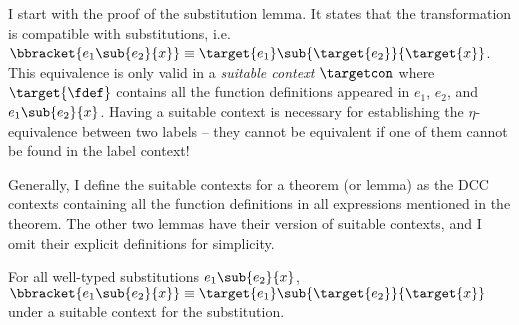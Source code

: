 I start with the proof of the substitution lemma. It states that the transformation is compatible with substitutions, i.e.~$\bbracket{e_1 \sub{e_2}{x}} \equiv \target{e_1} \sub{\target{e_2}}{\target{x}}$. This equivalence is only valid in a \textit{suitable context} $\targetcon$ where $\target{\fdef}$ contains all the function definitions appeared in $e_1$, $e_2$, and $e_1\sub{e_2}{x}$. Having a suitable context is necessary for establishing the  $\eta$-equivalence between two labels -- they cannot be equivalent if one of them cannot be found in the label context!

Generally, I define the suitable contexts for a theorem (or lemma) as the DCC contexts containing all the function definitions in all expressions mentioned in the theorem. The other two lemmas have their version of suitable contexts, and I omit their explicit definitions for simplicity.

\begin{lemma}[Substitution] For all well-typed substitutions $e_1 \sub{e_2}{x}$,\\
$\bbracket{e_1 \sub{e_2}{x}} \equiv \target{e_1}\sub{\target{e_2}}{\target{x}}$ under a suitable context for the substitution.

\label{lem:sub}
\end{lemma}
